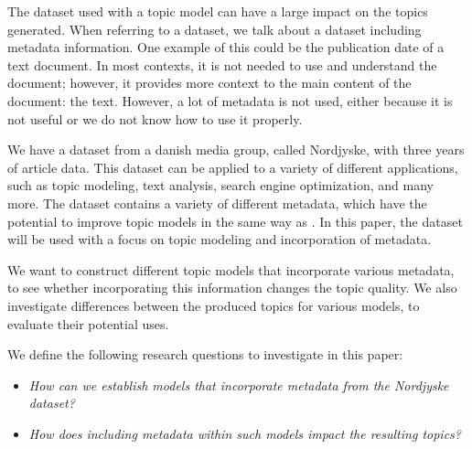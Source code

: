 The dataset used with a topic model can have a large impact on the topics generated.
When referring to a dataset, we talk about a dataset including metadata information.
One example of this could be the publication date of a text document. 
In most contexts, it is not needed to use and understand the document; however, it provides more context to the main content of the document: the text.
However, a lot of metadata is not used, either because it is not useful or we do not know how to use it properly.

We have a dataset from a danish media group, called Nordjyske, with three years of article data.
This dataset can be applied to a variety of different applications, such as topic modeling\cite{blei2003latent}\cite{MetaLDA2017}, text analysis\cite{baly2020written}, search engine optimization\cite{amjad2015topic}, and many more.
The dataset contains a variety of different metadata, which have the potential to improve topic models in the same way as \citet{author_topic_2012}. 
In this paper, the dataset will be used with a focus on topic modeling and incorporation of metadata.

We want to construct different topic models that incorporate various metadata, to see whether incorporating this information changes the topic quality.
We also investigate differences between the produced topics for various models, to evaluate their potential uses.

We define the following research questions to investigate in this paper:

\begin{itemize}
	\item \textit{How can we establish models that incorporate metadata from the Nordjyske dataset?}
	\item \textit{How does including metadata within such models impact the resulting topics?}
\end{itemize}


